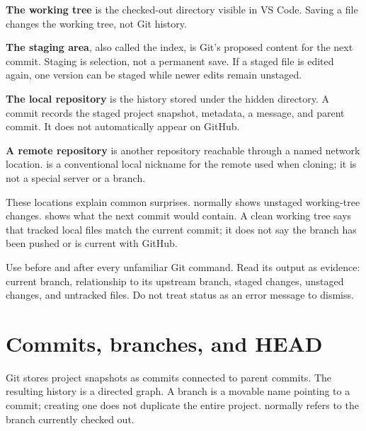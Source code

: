 \textbf{The working tree} is the checked-out directory visible in VS Code. Saving
a file changes the working tree, not Git history.

\textbf{The staging area}, also called the index, is Git's proposed content for
the next commit. Staging is selection, not a permanent save. If a staged file is
edited again, one version can be staged while newer edits remain unstaged.

\textbf{The local repository} is the history stored under the hidden
 directory. A commit records the staged project snapshot, metadata,
a message, and parent commit. It does not automatically appear on GitHub.

\textbf{A remote repository} is another repository reachable through a named
network location.  is a conventional local nickname for the remote
used when cloning; it is not a special server or a branch.

These locations explain common surprises.  normally shows
unstaged working-tree changes.  shows what the next
commit would contain. A clean working tree says that tracked local files match
the current commit; it does not say the branch has been pushed or is current
with GitHub.

\begin{professionalbox}
Use  before and after every unfamiliar Git command. Read its
output as evidence: current branch, relationship to its upstream branch, staged
changes, unstaged changes, and untracked files. Do not treat status as an error
message to dismiss.
\end{professionalbox}

\section{Commits, branches, and HEAD}

Git stores project snapshots as commits connected to parent commits. The
resulting history is a directed graph. A branch is a movable name pointing to a
commit; creating one does not duplicate the entire project.  normally
refers to the branch currently checked out.

\begin{center}
\end{center}


